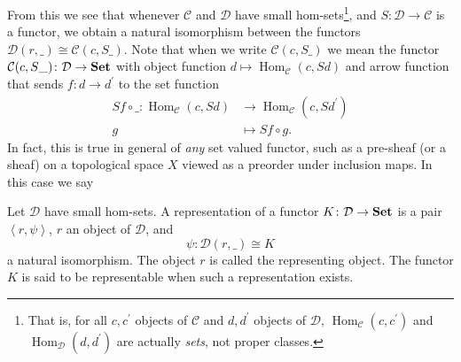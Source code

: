 \documentclass[10pt]{amsart}
\begin{document}
From this we see that whenever $\mathcal{C}$ and $\mathcal{D}$ have small hom-sets\footnote{That is, for all $c, c^\prime$ objects of $\mathcal{C}$ and $d, d^\prime$ objects of $\mathcal{D}$, 
  $\operatorname{Hom}_\mathcal{C}(c, c^\prime)$ and $\operatorname{Hom}_\mathcal{D}(d, d^\prime)$ are actually {\it sets}, not proper classes.},
and $S \colon \mathcal{D} \rightarrow \mathcal{C}$ is a functor, we obtain a natural isomorphism between the functors $\mathcal{D}(r,\_) \cong \mathcal{C}(c, S\_)$.
Note that when we write $\mathcal{C}(c, S\_)$ we mean the functor $\mathcal{C}(c, S\_) \colon \mathcal{D} \rightarrow {\bf Set}$ with object function $d \mapsto \operatorname{Hom}_\mathcal{C}(c, Sd)$ and arrow function that sends $f \colon d \rightarrow d^\prime$ to the set function 
\begin{align*}
  Sf \circ \_ \colon \operatorname{Hom}_\mathcal{C}(c, Sd) &\rightarrow \operatorname{Hom}_\mathcal{C}(c, Sd^\prime)\\
  g &\mapsto Sf \circ g.
\end{align*}
In fact, this is true in general of {\it any} set valued functor, such as a pre-sheaf (or a sheaf) on a topological space $X$ viewed as a preorder under inclusion maps.
In this case we say
  \begin{defn}
    Let $\mathcal{D}$ have small hom-sets.
    A representation of a functor $K \colon \mathcal{D} \rightarrow {\bf Set}$ is a pair $\left<r, \psi\right>$, $r$ an object of $\mathcal{D}$, and
    $$\psi \colon \mathcal{D}(r, \_) \cong K$$
    a natural isomorphism.
    The object $r$ is called the representing object.
    The functor $K$ is said to be representable when such a representation exists.
  \end{defn}
\end{document}
